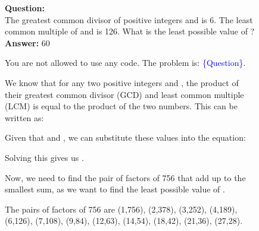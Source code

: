 \documentclass{article} \usepackage{iclr2023_conference,times}
\begin{document}
\begin{figure}[t]

\newlength{\oldcolumnsep}
\setlength{\oldcolumnsep}{\columnsep}
\setlength{\columnsep}{3pt}


\noindent \begin{minipage}{0.62\textwidth}
\begin{tcolorbox}[colback=blue!12!white,colframe=blue!75!black,title=Question,
    left=1mm,  right=1mm, top=1mm,   bottom=1mm ]
\begin{small}
\textbf{Question:}\\
The greatest common divisor of positive integers  and  is 6. The least common multiple of  and  is 126. What is the least possible value of ? \textbf{Answer:} 60
\end{small}

\vspace{0.2mm}
\end{tcolorbox}

\begin{minipage}{0.42\textwidth}
\begin{tcolorbox}[colback=red!5!white,colframe=red!75!black,title=\large(a)~\normalsize Model output,
    left=1mm,  right=1mm, top=1mm,   bottom=1mm ]
\begin{tiny}
\begin{tcolorbox}[colback=blue!9!white,colframe=blue!75!black,title=Prompt 1,
    left=1mm,  right=1mm, top=1mm,   bottom=1mm ]
\vspace{-1mm}
You are not allowed to use any code. The problem is: \textcolor{blue}{\{Question\}}.
\vspace{-1mm}
\end{tcolorbox}
We know that for any two positive integers  and , the product of their greatest common divisor (GCD) and least common multiple (LCM) is equal to the product of the two numbers. This can be written as:
 
\vspace{-4mm}
  

Given that  and , we can substitute these values into the equation:



Solving this gives us .

Now, we need to find the pair of factors of 756 that add up to the smallest sum, as we want to find the least possible value of .

The pairs of factors of 756 are (1,756), (2,378), (3,252), (4,189), (6,126), (7,108), (9,84), (12,63), (14,54), (18,42), (21,36), (27,28). 


\end{tiny}
\end{tcolorbox}
\end{minipage}
\end{minipage}
\end{figure}
\end{document}
